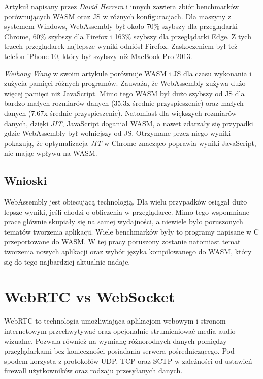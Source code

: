 \documentclass[language=polish,type=master]{aghmodern}
\begin{document}
Artykuł \cite{wasm_js_bench} napisany przez \emph{David Herrera} i innych zawiera zbiór benchmarków porównujących WASM oraz JS w różnych konfiguracjach.
Dla maszyny z systemem Windows, WebAssembly był około 70\% szybszy dla przeglądarki Chrome, 60\% szybszy dla Firefox i 163\% szybszy dla przeglądarki Edge.
Z tych trzech przeglądarek najlepsze wyniki odniósł Firefox.
Zaskoczeniem był też telefon iPhone 10, który był szybszy niż MacBook Pro 2013.

\emph{Weihang Wang} w swoim artykule \cite{wasm_js_bench2} porównuje WASM i JS dla czasu wykonania i zużycia pamięci różnych programów.
Zauważa, że WebAssembly zużywa dużo więcej pamięci niż JavaScript.
Mimo tego WASM był dużo szybszy od JS dla bardzo małych rozmiarów danych (35.3x średnie przyspieszenie) oraz małych danych (7.67x średnie przyspieszenie).
Natomiast dla większych rozmiarów danych, dzięki \emph{JIT}\footnotemark{}, JavaScript doganiał WASM, a nawet zdarzały się przypadki gdzie WebAssembly był wolniejszy od JS.
Otrzymane przez niego wyniki pokazują, że optymalizacja \emph{JIT} w Chrome znacząco poprawia wyniki JavaScript, nie mając wpływu na WASM.

\subsection{Wnioski}
WebAssembly jest obiecującą technologią.
Dla wielu przypadków osiągał dużo lepsze wyniki, jeśli chodzi o obliczenia w przeglądarce.
Mimo tego wspomniane prace głównie skupiały się na samej wydajności, a niewiele było poruszonych tematów tworzenia aplikacji.
Wiele benchmarków były to programy napisane w C przeportowane\footnotemark{} do WASM.
W tej pracy poruszony zostanie natomiast temat tworzenia nowych aplikacji oraz wybór języka kompilowanego do WASM, który się do tego najbardziej aktualnie nadaje.

\section{WebRTC vs WebSocket}
WebRTC to technologia umożliwiająca aplikacjom webowym i stronom internetowym przechwytywać oraz opcjonalnie strumieniować media audio-wizualne.
Pozwala również na wymianę różnorodnych danych pomiędzy przeglądarkami bez konieczności posiadania serwera pośredniczącego.
Pod spodem korzysta z protokołów UDP, TCP oraz SCTP w zależności od ustawień firewall użytkowników oraz rodzaju przesyłanych danych.
\end{document}
